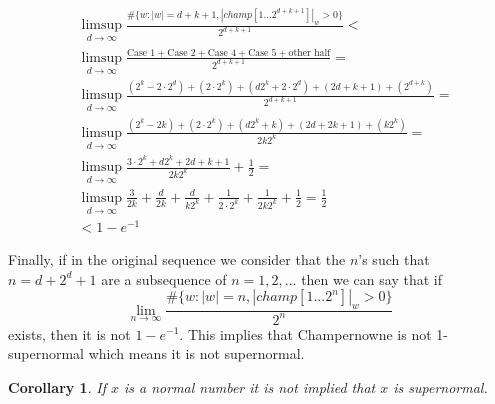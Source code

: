 \documentclass[11pt,a4paper]{tesis}
\newtheorem{corollary}{Corollary}[]
\newcommand{\note}[1]{\textbf{\color{red}{#1}}}
\begin{document}
\begin{align*}
&\limsup_{d\to\infty} \frac{\#\{w : |w| = d+k+1, |champ[1 \dots 2^{d+k+1}]|_w > 0 \}}{2^{d+k+1}} <\\
&\limsup_{d\to\infty} \frac{ \textrm{Case 1} + \textrm{Case 2}+ \textrm{Case 4} + \textrm{Case 5} + \textrm{other half}}{2^{d+k+1}} =\\
&\limsup_{d\to\infty} \frac{(2^k - 2\cdot 2^d) + (2 \cdot 2^k)+ (d2^k + 2 \cdot 2^d) + (2d+k+1) + (2^{d+k}) }{2^{d+k+1}} =\\
&\limsup_{d\to\infty} \frac{(2^k - 2k) + (2 \cdot 2^k)+ (d2^k + k) + (2d+2k+1) + (k2^{k})}{2k2^{k}} =\\
&\limsup_{d\to\infty} \frac{3\cdot2^k + d2^k  + 2d+k+1}{2k2^{k}} + \frac{1}{2} =\\
&\limsup_{d\to\infty} \frac{3}{2k} + \frac{d}{2k} + \frac{d}{k2^{k}} + \frac{1}{2\cdot2^{k}} + \frac{1}{2k2^{k}} + \frac{1}{2} = \frac{1}{2} \\
&< 1 - e^{-1}
\end{align*}

Finally, if in the original sequence we consider that the $n$'s such that $n = d + 2^d + 1$ are a subsequence of $n=1,2,\dots$ then we can say that if
$$\lim_{n\to\infty} \frac{\#\{w: |w| = n  , |champ[1...2^n]|_w > 0\}}{2^n}$$
exists, then it is not $1 - e^{-1}$.
This implies that Champernowne is not 1-supernormal which means it is not supernormal.

\begin{corollary}
If $x$ is a normal number it is not implied that $x$ is supernormal.
\end{corollary}



\backmatter


\end{document}
